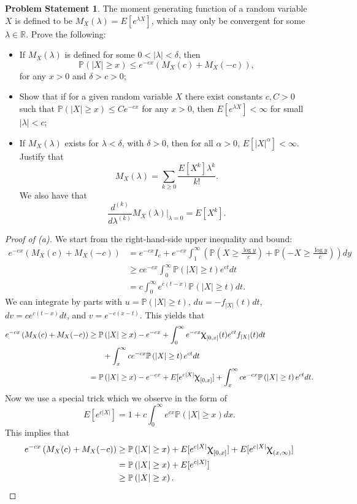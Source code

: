 \documentclass[12pt,reqno]{article}
\theoremstyle{plain}
\theoremstyle{definition}
\newtheorem{problem}[theorem]{Problem Statement}
\newcommand{\PP}[1]{\ensuremath{\mathbb{P}\left(#1\right)}}
\renewcommand{\chi}{\scalebox{1.25}{$\upchi$}}
\begin{document}
\begin{problem}
The moment generating function of a random variable $X$ is defined to be 
$M_X(\lambda) = E[e^{\lambda X}]$, which may only be convergent for some 
$\lambda \in \mathbb{R}$. Prove the following: 
\begin{itemize} 

\item[a.] If $M_X(\lambda)$ is defined for some $0 < |\lambda| < \delta$,
     then 
     \[
     \PP{|X| \geq x} \leq e^{-cx}\left(M_X(c)+M_X(-c)\right), 
     \]
     for any $x > 0$ and $\delta > c > 0$; 
\item[b.] Show that if for a given random variable $X$ there exist constants 
     $c,C > 0$ such that $\PP{|X| \geq x} \leq C e^{-cx}$ for any $x > 0$, 
     then $E[e^{\lambda X}] < \infty$ for small $|\lambda| < c$; 
\item[c.] If $M_X(\lambda)$ exists for $\lambda < \delta$, with $\delta > 0$, 
     then for all $\alpha > 0$, $E[|X|^{\alpha}] < \infty$. Justify that 
     \[
     M_X(\lambda) = \sum_{k \geq 0} \frac{E[X^k] \lambda^k}{k!}. 
     \]
     We also have that 
     \[
     \frac{d^{(k)}}{d\lambda^{(k)}} M_X(\lambda) \Bigr\rvert_{\lambda = 0} = 
          E[X^k]. 
     \]

\end{itemize} 
\end{problem} 
\begin{proof}[Proof of (a)]
We start from the right-hand-side upper inequality and bound: 
\begin{align*} 
e^{-cx}\left(M_X(c) + M_X(-c)\right) & = e^{-cx} I_c + e^{-cx} 
     \int_1^{\infty}\left(\PP{X \geq \frac{\log y}{c}} + 
     \PP{-X \geq \frac{\log y}{c}}\right) dy \\ 
     & \geq c e^{-cx} \int_0^{\infty} \PP{|X| \geq t} e^{ct} dt \\ 
     & = c \int_0^{\infty} e^{c(t-x)} \PP{|X| \geq t} dt. 
\end{align*} 
We can integrate by parts with $u = \PP{|X| \geq t}$, 
$du = -f_{|X|}(t) dt$, $dv = c e^{c(t-x)} dt$, and $v = e^{-c(x-t)}$. 
This yields that 
\begin{align*} 
e^{-cx}\left(M_X(c) + M_X(-c)\right) & \geq 
     \PP{|X| \geq x} - e^{-cx} + \int_0^{\infty} e^{-cx} \chi_{[0,x]}(t) 
     e^{ct} f_{|X|}(t) dt \\ 
     & \phantom{==\ } + 
     \int_x^{\infty} c e^{-cx} \PP{|X| \geq t} e^{ct} dt \\ 
     & = 
     \PP{|X| \geq x} -e^{-cx} + E[e^{c|X|} \chi_{[0,x]}] + 
     \int_x^{\infty} c e^{-cx} \PP{|X| \geq t} e^{ct} dt. 
\end{align*} 
Now we use a special trick which we observe in the form of 
\[
E[e^{c |X|}] = 1 + c \int_0^{\infty} e^{cx} \PP{|X| \geq x} dx. 
\]
This implies that 
\begin{align*} 
e^{-cx}\left(M_X(c) + M_X(-c)\right) & \geq 
     \PP{|X| \geq x} + E[e^{c|X|} \chi_{[0,x]}] + 
     E[e^{c|X|} \chi_{(x,\infty)}] \\ 
     & = \PP{|X| \geq x} + E[e^{c|X|}] \\ 
     & \geq \PP{|X| \geq x}. 
     \qedhere
\end{align*} 
\end{proof} 
\end{document}
